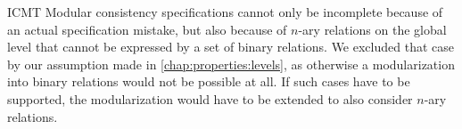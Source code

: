 \begin{copiedFrom}{ICMT}
Modular consistency specifications cannot only be incomplete because of an actual specification mistake, but also because of $n$-ary relations on the global level that cannot be expressed by a set of binary relations.
We excluded that case by our assumption made in \autoref{chap:properties:levels}, as otherwise a modularization into binary relations would not be possible at all.
If such cases have to be supported, the modularization would have to be extended to also consider $n$-ary relations.


\end{copiedFrom}

